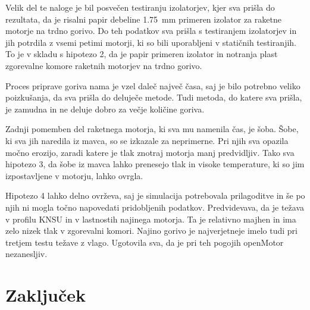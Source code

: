 \documentclass[titlepage, a4paper, twoside, final, 12pt]{article}
\begin{document}
	Velik del te naloge je bil posvečen testiranju izolatorjev, kjer sva prišla do rezultata, da je risalni papir debeline \SI{1,75}{mm} primeren izolator za raketne motorje na trdno gorivo.
	Do teh podatkov sva prišla s testiranjem izolatorjev in jih potrdila z vsemi petimi motorji, ki so bili uporabljeni v statičnih testiranjih. To je v skladu s hipotezo 2, da je papir primeren izolator in notranja plast zgorevalne komore raketnih motorjev na trdno gorivo.

	Proces priprave goriva nama je vzel daleč največ časa, saj je bilo potrebno veliko poizkušanja, da sva prišla do deluječe metode. Tudi metoda, do katere sva prišla, je zamudna in ne deluje dobro za večje količine goriva.
	
	Zadnji pomemben del raketnega motorja, ki sva mu namenila čas, je šoba. Šobe, ki sva jih naredila iz mavca, so se izkazale za neprimerne.
	Pri njih sva opazila močno erozijo, zaradi katere je tlak znotraj motorja manj predvidljiv.
	Tako sva hipotezo 3, da šobe iz mavca lahko prenesejo tlak in visoke temperature, ki so jim izpostavljene v motorju, lahko ovrgla.

	Hipotezo 4 lahko delno ovrževa, saj je simulacija potrebovala prilagoditve in še po njih ni mogla točno napovedati pridobljenih podatkov.
	Predvidevava, da je težava v profilu KNSU in v lastnostih najinega motorja. Ta je relativno majhen in ima zelo nizek tlak v zgorevalni komori.
	Najino gorivo je najverjetneje imelo tudi pri tretjem testu težave z vlago. Ugotovila sva, da je pri teh pogojih openMotor nezanesljiv.
	
	\section{Zaključek}
\end{document}
